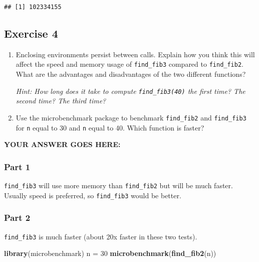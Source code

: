 \documentclass[
]{article}
\newenvironment{Shaded}{\begin{snugshade}}{\end{snugshade}}
\newcommand{\DecValTok}[1]{\textcolor[rgb]{0.00,0.00,0.81}{#1}}
\newcommand{\KeywordTok}[1]{\textcolor[rgb]{0.13,0.29,0.53}{\textbf{#1}}}
\newcommand{\NormalTok}[1]{#1}
\newcommand{\StringTok}[1]{\textcolor[rgb]{0.31,0.60,0.02}{#1}}
\begin{document}
\begin{verbatim}
## [1] 102334155
\end{verbatim}

\hypertarget{exercise-4}{%
\subsection{Exercise 4}\label{exercise-4}}

\begin{enumerate}
\def\labelenumi{\arabic{enumi}.}
\item
  Enclosing environments persist between calls. Explain how you think
  this will affect the speed and memory usage of \texttt{find\_fib3}
  compared to \texttt{find\_fib2}. What are the advantages and
  disadvantages of the two different functions?

  \emph{Hint: How long does it take to compute \texttt{find\_fib3(40)}
  the first time? The second time? The third time?}
\item
  Use the microbenchmark package to benchmark \texttt{find\_fib2} and
  \texttt{find\_fib3} for \texttt{n} equal to 30 and \texttt{n} equal to
  40. Which function is faster?
\end{enumerate}

\textbf{YOUR ANSWER GOES HERE:}

\hypertarget{part-1-1}{%
\subsubsection{Part 1}\label{part-1-1}}

\texttt{find\_fib3} will use more memory than \texttt{find\_fib2} but
will be much faster. Usually speed is preferred, so \texttt{find\_fib3}
would be better.

\hypertarget{part-2-1}{%
\subsubsection{Part 2}\label{part-2-1}}

\texttt{find\_fib3} is much faster (about 20x faster in these two
tests).

\begin{Shaded}
\begin{Highlighting}[]
\KeywordTok{library}\NormalTok{(microbenchmark)}
\NormalTok{n =}\StringTok{ }\DecValTok{30}
\KeywordTok{microbenchmark}\NormalTok{(}\KeywordTok{find\_fib2}\NormalTok{(n))}
\end{Highlighting}
\end{Shaded}
\end{document}
